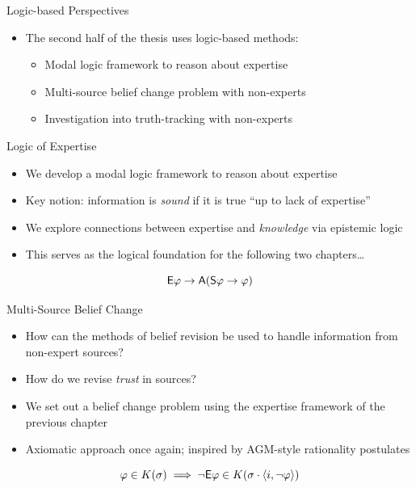 \documentclass[10pt]{beamer}
\begin{document}
\begin{frame}{Logic-based Perspectives}
    \begin{itemize}
        \item The second half of the thesis uses logic-based methods:
        \begin{itemize}
            \item \alert{Modal logic} framework to reason about expertise
            \item Multi-source \alert{belief change} problem with non-experts
            \item Investigation into \alert{truth-tracking} with non-experts
        \end{itemize}
    \end{itemize}
\end{frame}

\begin{frame}{Logic of Expertise}
    \begin{itemize}
        \item We develop a modal logic framework to reason about
              \alert{expertise}
        \item Key notion: information is \emph{sound} if it is true ``up to
              lack of expertise''
        \item We explore connections between expertise and \emph{knowledge} via
              epistemic logic
        \item This serves as the logical foundation for the following two
              chapters\ldots
    \end{itemize}

    \[
        \mathsf{E}\varphi \rightarrow \mathsf{A}(\mathsf{S}\varphi \rightarrow \varphi)
    \]
\end{frame}

\begin{frame}{Multi-Source Belief Change}

    \begin{itemize}
        \item How can the methods of \alert{belief revision} be used to
              handle information from non-expert sources?
        \item How do we revise \emph{trust} in sources?
        \item We set out a belief change problem using the expertise framework
              of the previous chapter
        \item Axiomatic approach once again; inspired by AGM-style rationality
              postulates
    \end{itemize}

    \[
        \varphi \in K(\sigma) \implies \neg\mathsf{E}\varphi \in K(\sigma \cdot
        \langle {i, \neg\varphi} \rangle)
    \]
\end{frame}
\end{document}
